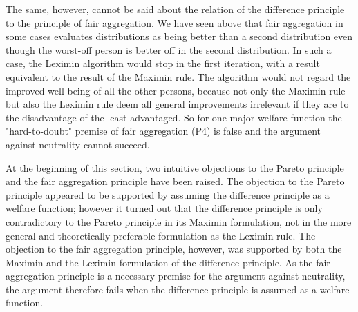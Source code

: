 The same, however, cannot be said about the relation of the difference principle to the principle of fair aggregation. We have seen above that fair aggregation in some cases evaluates distributions as being better than a second distribution even though the worst-off person is better off in the second distribution. In such a case, the Leximin algorithm would stop in the first iteration, with a result equivalent to the result of the Maximin rule. The algorithm would not regard the improved well-being of all the other persons, because not only the Maximin rule but also the Leximin rule deem all general improvements irrelevant if they are to the disadvantage of the least advantaged. So for one major welfare function the "hard-to-doubt" premise of fair aggregation (P4) is false and the argument against neutrality cannot succeed. 

At the beginning of this section, two intuitive objections to the Pareto principle and the fair aggregation principle have been raised. The objection to the Pareto principle appeared to be supported by assuming the difference principle as a welfare function; however it turned out that the difference principle is only contradictory to the Pareto principle in its Maximin formulation, not in the more general and theoretically preferable formulation as the Leximin rule. The objection to the fair aggregation principle, however, was supported by both the Maximin and the Leximin formulation of the difference principle. As the fair aggregation principle is a necessary premise for the argument against neutrality, the argument therefore fails when the difference principle is assumed as a welfare function. 